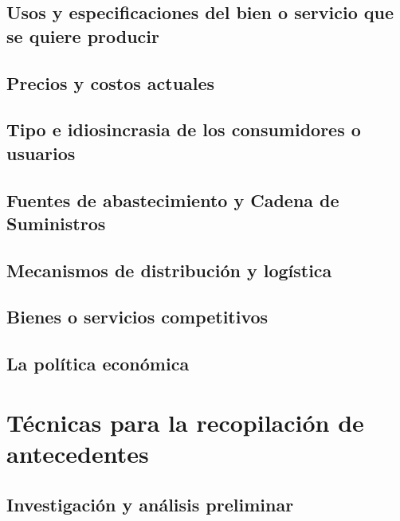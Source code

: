 \documentclass[crop=false]{standalone}
\begin{document}
\blindtext

\subsection{ Usos y especificaciones del bien o servicio que se quiere producir}

\blindtext


\subsection{ Precios y costos actuales}

\blindtext


\subsection{ Tipo e idiosincrasia de los consumidores o usuarios}

\blindtext


\subsection{Fuentes de abastecimiento y Cadena de Suministros}

\blindtext


\subsection{Mecanismos de distribución y logística}

\blindtext


\subsection{Bienes o servicios competitivos}

\blindtext


\subsection{La política económica}

\blindtext


\section{Técnicas para la recopilación de antecedentes}




\subsection{Investigación y análisis preliminar}
\end{document}
